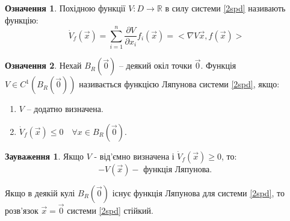 \documentclass[14pt,a4paper]{scrartcl}
\theoremstyle{definition}
\newtheorem*{defo}{Означення}
\newtheorem*{remark}{Зауваження}
\theoremstyle{definition}
\theoremstyle{definition}
\begin{document}
 \begin{defo}
Похідною функції $ V : D \to \mathbb{R}$ в силу системи \eqref{2spd} називають функцію:
$$
\dot{V}_f(\overrightarrow{x}) =  \sum\limits_{i = 1}^{n}{ \frac{\partial V}{ \partial x_i} f_{i}( \overrightarrow{x}) } = <\nabla V \overrightarrow{x}, f(\overrightarrow{x})>
$$
 \end{defo}

\begin{defo}
  Нехай $B_{R} ( \overrightarrow{0} ) $ -- деякий окіл точки $ \overrightarrow{0} $. Функція $V \in C^{1} (B_{R} (\overrightarrow{0}))$ називається функцією Ляпунова системи \eqref{2spd}, якщо:
\begin{enumerate}
  \item $V$ -- додатно визначена.
  \item $\dot{V}_f (\overrightarrow{x}) \leq 0 \quad \forall x \in B_{R} ( \overrightarrow{0})$.
\end{enumerate}
\end{defo}

\begin{remark}
    Якщо $ V $ - від'ємно визначена і $ \dot{V}_f ( \overrightarrow{x}) \geq 0$, то: $$ - V ( \overrightarrow{x} ) - \text{ функція Ляпунова. }$$
\end{remark}

\begin{boxteo}
  Якщо в деякій кулі $B_{R}( \overrightarrow{0}) $ існує функція Ляпунова для системи \eqref{2spd}, то розв'язок $ \overrightarrow{x} = \overrightarrow{0} $ системи \eqref{2spd} стійкий.
\end{boxteo}
\end{document}
